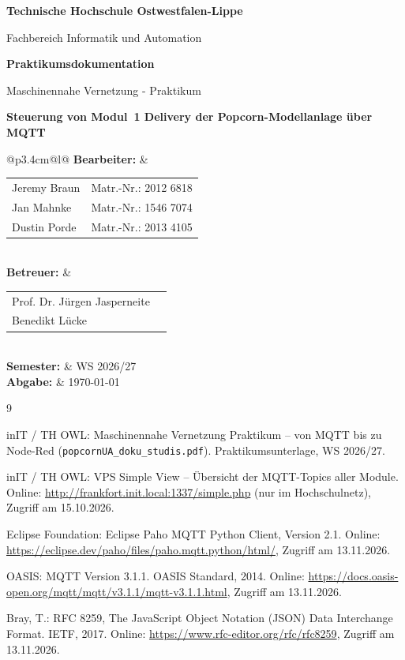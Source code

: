 \documentclass[12pt,a4paper]{report}
\makeatletter
\newcommand{\Hochschule}{Technische Hochschule Ostwestfalen-Lippe}
\newcommand{\Fachbereich}{Fachbereich Informatik und Automation}
\newcommand{\Lehrveranstaltung}{Maschinennahe Vernetzung - Praktikum}
\newcommand{\Arbeitstyp}{Praktikumsdokumentation}
\newcommand{\Arbeitstitel}{Steuerung von Modul~1 \glqq Delivery\grqq{} der Popcorn-Modellanlage über MQTT}
\newcommand{\Semester}{WS 2026/27}
\newcommand{\Abgabedatum}{\today}
\newcommand{\AutorenTabelle}{%
  \begin{tabular}{@{}ll@{}}
    Jeremy Braun & Matr.-Nr.: 2012 6818 \\
    Jan Mahnke   & Matr.-Nr.: 1546 7074 \\
    Dustin Porde & Matr.-Nr.: 2013 4105 \\
  \end{tabular}%
}
\newcommand{\BetreuerTabelle}{%
  \begin{tabular}{@{}ll@{}}
    Prof. Dr. Jürgen Jasperneite \\
    Benedikt Lücke \\
  \end{tabular}%
}
\newcommand{\makedeckblatt}{%
  \begin{titlepage}
    \thispagestyle{empty}
    \centering
    \vspace*{1.0cm}
    {\fontsize{23pt}{28pt}\selectfont\bfseries \Hochschule\par}
    \vspace{0.6cm}
    {\fontsize{16pt}{20pt}\selectfont \Fachbereich\par}
    \vspace{1.6cm}
    {\fontsize{22pt}{26pt}\selectfont\bfseries \Arbeitstyp\par}
    \vspace{0.4cm}
    {\fontsize{14pt}{18pt}\selectfont \Lehrveranstaltung\par}
    \vspace{1.4cm}
    {\fontsize{18pt}{24pt}\selectfont\bfseries \Arbeitstitel\par}
    \vfill
    \begin{flushleft}
      \fontsize{13pt}{18pt}\selectfont
      \begin{tabular}{@{}p{3.4cm}@{\hspace{0.4cm}}l@{}}
        \textbf{Bearbeiter:} & \AutorenTabelle \\[1cm]
        \textbf{Betreuer:}   & \BetreuerTabelle \\[0.6cm]
        \textbf{Semester:}   & \Semester \\[0.3cm]
        \textbf{Abgabe:}     & \Abgabedatum \\
      \end{tabular}
    \end{flushleft}
    \vspace{1cm}
  \end{titlepage}
}
\makeatother
\begin{document}
\makedeckblatt

\setcounter{page}{1}

\clearpage
{}
{}
\tableofcontents

\clearpage
{}
{}
\listoffigures

\clearpage
{}
{}
\listoftables



\clearpage
{}
\setcounter{page}{1}








\clearpage
{}
{}
\begin{thebibliography}{9}
  \raggedright
  inIT / TH OWL: Maschinennahe Vernetzung Praktikum -- von MQTT bis zu Node-Red
  (\texttt{popcornUA\_doku\_studis.pdf}). Praktikumsunterlage, \Semester.

  inIT / TH OWL: VPS Simple View -- Übersicht der MQTT-Topics aller Module.
  Online: \url{http://frankfort.init.local:1337/simple.php} (nur im Hochschulnetz),
  Zugriff am 15.10.2026.

  Eclipse Foundation: Eclipse Paho MQTT Python Client, Version 2.1.
  Online: \url{https://eclipse.dev/paho/files/paho.mqtt.python/html/}, Zugriff am 13.11.2026.

  OASIS: MQTT Version 3.1.1. OASIS Standard, 2014.
  Online: \url{https://docs.oasis-open.org/mqtt/mqtt/v3.1.1/mqtt-v3.1.1.html}, Zugriff am 13.11.2026.

  Bray, T.: RFC 8259, The JavaScript Object Notation (JSON) Data Interchange Format.
  IETF, 2017. Online: \url{https://www.rfc-editor.org/rfc/rfc8259}, Zugriff am 13.11.2026.
\end{thebibliography}
\end{document}
